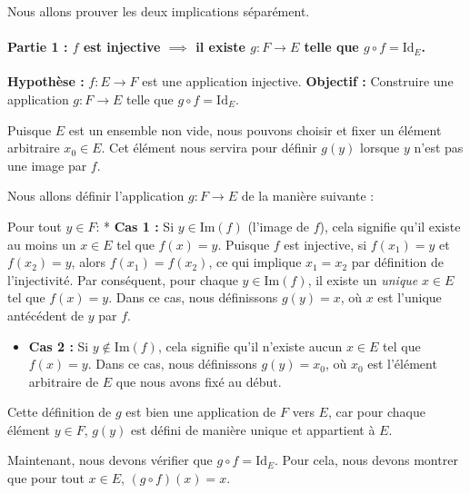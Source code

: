 \documentclass[12pt,a4paper]{report}
\providecommand{\tightlist}{%
  \setlength{\itemsep}{0pt}\setlength{\parskip}{0pt}}
\begin{document}
Nous allons prouver les deux implications séparément.

\paragraph{\texorpdfstring{Partie 1 : \(f\) est injective \(\implies\)
il existe \(g: F \to E\) telle que
\(g \circ f = \text{Id}_E\).}{Partie 1 : f est injective \textbackslash implies il existe g: F \textbackslash to E telle que g \textbackslash circ f = \textbackslash text\{Id\}\_E.}}\label{partie-1-f-est-injective-implies-il-existe-g-f-to-e-telle-que-g-circ-f-textid_e.}

\textbf{Hypothèse :} \(f: E \to F\) est une application injective.
\textbf{Objectif :} Construire une application \(g: F \to E\) telle que
\(g \circ f = \text{Id}_E\).

Puisque \(E\) est un ensemble non vide, nous pouvons choisir et fixer un
élément arbitraire \(x_0 \in E\). Cet élément nous servira pour définir
\(g(y)\) lorsque \(y\) n'est pas une image par \(f\).

Nous allons définir l'application \(g: F \to E\) de la manière suivante
:

Pour tout \(y \in F\): * \textbf{Cas 1 :} Si \(y \in \text{Im}(f)\)
(l'image de \(f\)), cela signifie qu'il existe au moins un \(x \in E\)
tel que \(f(x) = y\). Puisque \(f\) est injective, si \(f(x_1) = y\) et
\(f(x_2) = y\), alors \(f(x_1) = f(x_2)\), ce qui implique \(x_1 = x_2\)
par définition de l'injectivité. Par conséquent, pour chaque
\(y \in \text{Im}(f)\), il existe un \emph{unique} \(x \in E\) tel que
\(f(x) = y\). Dans ce cas, nous définissons \(g(y) = x\), où \(x\) est
l'unique antécédent de \(y\) par \(f\).

\begin{itemize}
\tightlist
\item
  \textbf{Cas 2 :} Si \(y \notin \text{Im}(f)\), cela signifie qu'il
  n'existe aucun \(x \in E\) tel que \(f(x) = y\). Dans ce cas, nous
  définissons \(g(y) = x_0\), où \(x_0\) est l'élément arbitraire de
  \(E\) que nous avons fixé au début.
\end{itemize}

Cette définition de \(g\) est bien une application de \(F\) vers \(E\),
car pour chaque élément \(y \in F\), \(g(y)\) est défini de manière
unique et appartient à \(E\).

Maintenant, nous devons vérifier que \(g \circ f = \text{Id}_E\). Pour
cela, nous devons montrer que pour tout \(x \in E\),
\((g \circ f)(x) = x\).
\end{document}
